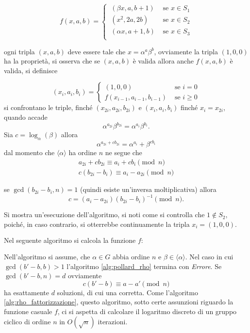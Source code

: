 \begin{equation*}
    f(x,a,b) = 
    \begin{cases}
        \ (\beta x, a,b+1) &\text{ se } x \in S_1\\    
        \ (x^2, 2a,2b) &\text{ se } x \in S_2\\
        \ (\alpha x, a+1,b) &\text{ se } x \in S_3 \\   
    \end{cases}
\end{equation*}

ogni tripla $(x,a,b)$ deve essere tale che $x = \alpha^a\beta^b$, ovviamente la tripla $(1,0,0)$ ha la proprietà, si osserva che se $(x,a,b)$ è valida allora anche $f(x,a,b)$ è valida, si definisce 

\begin{equation*}
    (x_i,a_i,b_i) = 
    \begin{cases}
        (1,0,0) &\text{ se } i = 0\\
        f(x_{i-1},a_{i-1},b_{i-1}) &\text{ se } i \geq 0        
    \end{cases}
\end{equation*}
si confrontano le triple, finché $(x_{2i},a_{2i},b_{2i})$ e $(x_i,a_i,b_i)$ finché $x_i = x_{2i}$, quando accade
\[
    \alpha^{a_{2i}}\beta^{b_{2i}} = \alpha^{a_i}\beta^{b_i}.
\]
Sia $c = \log_\alpha(\beta)$  allora
\[
    \alpha^{a_{2i} + cb_{2i}} = \alpha^{a_i}+\beta^{cb_i}
\]
dal momento che $\langle \alpha \rangle$ ha ordine $n$ ne segue che 
\begin{align*}    
    a_{2i} + cb_{2i} \equiv a_i + cb_i \pmod n \\
    c(b_{2i} - b_i) \equiv a_i - a_{2i} \pmod n
\end{align*}

se $\gcd(b_{2i} - b_i,n) = 1$ (quindi esiste un'inversa moltiplicativa) allora
\[
    c = (a_i - a_{2i})(b_{2i}-b_i)^{-1} \pmod n .
\]

Si mostra un'esecuzione dell'algoritmo, si noti come si controlla che $1 \notin S_2$, poiché, in caso contrario, si otterrebbe continuamente la tripla $x_i = (1,0,0)$.

Nel seguente algoritmo si calcola la funzione $f$:




Nell'algoritmo si assume, che $\alpha \in G$ abbia ordine $n$ e $\beta \in \langle \alpha \rangle$.
Nel caso in cui $\gcd(b'-b,b) > 1$ l'algoritmo \ref{alg:pollard_rho} termina con \emph{Errore}. Se $\gcd(b'-b,n) = d$ ovviamente \[
    c(b'-b) \equiv a- a' \pmod n 
\] 
ha esattamente $d$ soluzioni, di cui una corretta.
Come l'algoritmo \ref{alg:rho_fattorizzazione}, questo algoritmo, sotto certe assunzioni riguardo la funzione casuale $f$, ci si aspetta di calcolare il logaritmo discreto di un gruppo ciclico di ordine $n$ in $O(\sqrt{n})$ iterazioni.

